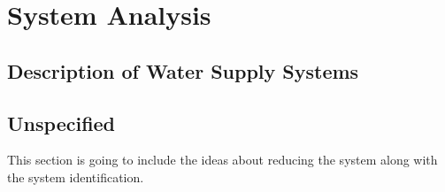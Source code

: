 
\part{System Analysis}
\label{system_analysis}

\chapter{Description of Water Supply Systems}
\label{description_of_water_supply_systems}

 





\chapter{Unspecified}
\label{unspecified}

This section is going to include the ideas about reducing the system along with the system identification. 





























